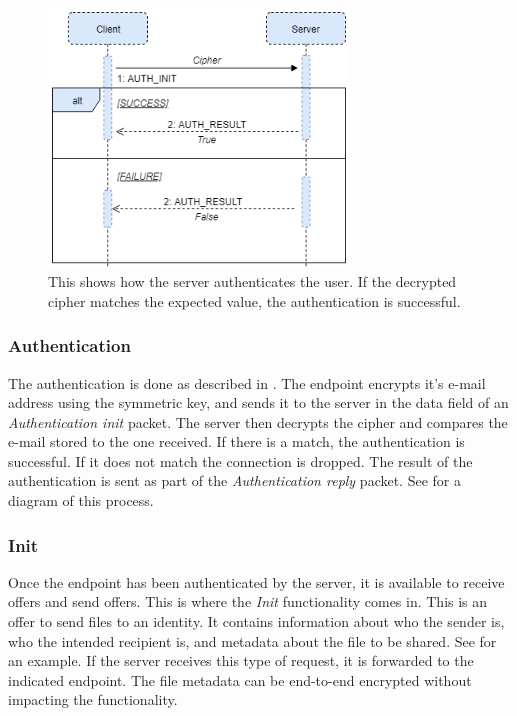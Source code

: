 	\begin{figure}[th]
	  \centering
	  \includegraphics[width=80mm]{Figures/ACS_Prot/Auth_Init}
	  \decoRule
	  \caption[ACS protocol: Authentication]{This shows how the server authenticates the user. If the decrypted cipher matches the expected value, the authentication is successful.}
	  \label{fig:prot_auth}
	\end{figure}

	\subsubsection*{Authentication}
	The authentication is done as described in . The endpoint encrypts it's e-mail address using the symmetric key, and sends it to the server in the data field of an \emph{Authentication init} packet. The server then decrypts the cipher and compares the e-mail stored to the one received. If there is a match, the authentication is successful. If it does not match the connection is dropped. The result of the authentication is sent as part of the \emph{Authentication reply} packet. See  for a diagram of this process. 
	
	\subsubsection*{Init}
	Once the endpoint has been authenticated by the server, it is available to receive offers and send offers. This is where the \emph{Init} functionality comes in. This is an offer to send files to an identity. It contains information about who the sender is, who the intended recipient is, and metadata about the file to be shared. See  for an example. If the server receives this type of request, it is forwarded to the indicated endpoint. The file metadata can be end-to-end encrypted without impacting the functionality.

